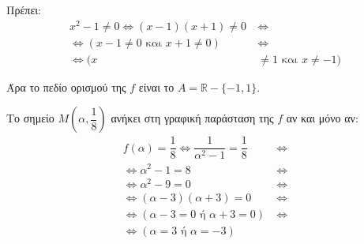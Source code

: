 
\begin{alist}
\item Πρέπει:
\begin{align*}
x^2 - 1 \ne 0 \Leftrightarrow (x - 1)(x + 1) \ne 0 \ &\Leftrightarrow \\
\Leftrightarrow (x - 1 \ne 0 \text{ και } x + 1 \ne 0) \ &\Leftrightarrow \\
\Leftrightarrow (x &\ne 1 \text{ και } x \ne -1)
\end{align*}

Άρα το πεδίο ορισμού της $f$ είναι το $A = \mathbb{R} - \{-1, 1\}$.

\item Το σημείο $M\left(\alpha, \dfrac{1}{8}\right)$ ανήκει στη γραφική παράσταση της $f$ αν και μόνο αν:
\begin{align*}
f(\alpha) = \dfrac{1}{8} \Leftrightarrow \dfrac{1}{\alpha^2 - 1} = \dfrac{1}{8} \ &\Leftrightarrow \\
\Leftrightarrow \alpha^2 - 1 = 8 \ &\Leftrightarrow \\
\Leftrightarrow \alpha^2 - 9 = 0 \ &\Leftrightarrow \\
\Leftrightarrow (\alpha - 3)(\alpha + 3) = 0 \ &\Leftrightarrow \\
\Leftrightarrow (\alpha - 3 = 0 \text{ ή } \alpha + 3 = 0) \ &\Leftrightarrow \\
\Leftrightarrow (\alpha = 3 \text{ ή } \alpha = -3)&
\end{align*}
\end{alist}

